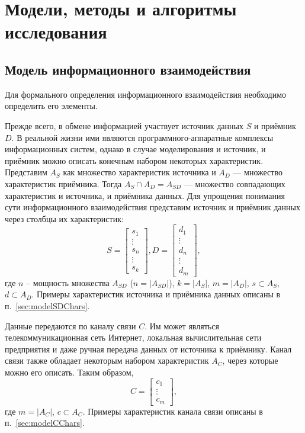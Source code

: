 \section{Модели, методы и алгоритмы исследования}

\subsection{Модель информационного взаимодействия}

Для формального определения информационного взаимодействия необходимо определить его элементы.

Прежде всего, в обмене информацией участвует источник данных $S$ и приёмник $D$.
В реальной жизни ими являются программного-аппаратные комплексы информационных систем, однако в случае моделирования и источник, и приёмник можно описать конечным набором некоторых характеристик.
Представим $A_S$ как множество характеристик источника и $A_D$ --- множество характеристик приёмника.
Тогда $A_S \cap A_D = A_{SD}$ --- множество совпадающих характеристик и источника, и приёмника данных.
Для упрощения понимания сути информационного взаимодействия представим источник и приёмник данных через столбцы их характеристик:
$$S = \begin{bmatrix}
s_{1} \\
\vdots \\
s_{n} \\         
\vdots \\
s_{k}
\end{bmatrix},
D = \begin{bmatrix}
d_{1} \\
\vdots \\
d_{n} \\         
\vdots \\
d_{m}
\end{bmatrix},$$
где $n$ -- мощность множества $A_{SD}$ ($n = |A_{SD}|$), $k = |A_S|$, $m = |A_D|$, $s \subset A_S$, $d \subset A_D$.
Примеры характеристик источника и приёмника данных описаны в п.~\ref{sec:modelSDChars}.

Данные передаются по каналу связи $C$.
Им может являться телекоммуникационная сеть Интернет, локальная вычислительная сети предприятия и даже ручная передача данных от источника к приёмнику.
Канал связи также обладает некоторым набором характеристик $A_C$, через которые можно его описать.
Таким образом,
$$
C = \begin{bmatrix}
c_{1} \\
\vdots \\
c_{m}
\end{bmatrix},
$$
где $m = |A_C|$, $c \subset A_C$.
Примеры характеристик канала связи описаны в п.~\ref{sec:modelCChars}.

